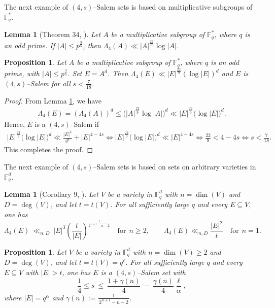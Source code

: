 \documentclass[11pt]{article}
\newtheorem{proposition}[theorem]{Proposition}
\newtheorem{lemma}[theorem]{Lemma}
\begin{document}
The next example of $(4, s)$--Salem sets is based on multiplicative subgroups of $\mathbb{F}_q^*$.
\begin{lemma}[Theorem 34, \cite{skredov}]\label{lemma:A-multiplicative}
    Let $A$ be a multiplicative subgroup of $\mathbb{F}_q^*$, where $q$ is an odd prime. If $|A|\le p^{\frac{3}{5}}$, then $\Lambda_4(A)\ll |A|^{\frac{22}{9}}\log |A|$.
\end{lemma}

\begin{proposition}\label{prop:mul}
     Let $A$ be a multiplicative subgroup of $\mathbb{F}_q^*$, where $q$ is an odd prime, with $|A|\le p^{\frac{3}{5}}$. Set $E=A^d$. Then $\Lambda_4(E)\ll |E|^{\frac{22}{9}}(\log |E|)^d$ and $E$ is $(4, s)$--Salem for all $s<\frac{7}{18}$.
\end{proposition}
\begin{proof}
    From Lemma \ref{lemma:A-multiplicative}, we have
    \begin{align*}
        \Lambda_4(E)=(\Lambda_4(A))^d \leq \bigg(|A|^{\frac{22}{9}}\log |A|  \bigg)^d \ll |E|^{\frac{22}{9}} \big(\log |E|  \big)^d. 
    \end{align*}
    Hence, $E$ is a $(4,s)$--Salem if 
    \begin{align*}
        |E|^{\frac{22}{9}} \big(\log |E|  \big)^d \ll \frac{|E|^4}{q^d}+|E|^{4-4s} \Leftrightarrow |E|^{\frac{22}{9}} \big(\log |E|  \big)^d \ll |E|^{4-4s} \Leftrightarrow \frac{22}{9}<4-4s \Leftrightarrow s<\frac{7}{18}.
    \end{align*}
This completes the proof.
\end{proof}


The next example of $(4, s)$--Salem sets is based on sets on arbitrary varieties in $\mathbb{F}_q^d$.
\begin{lemma}[Corollary 9, \cite{shkredov2}]\label{lemma-V-variety}
Let $V$ be a variety in $\mathbb{F}_q^d$ with
$n=\dim(V)$ and $D=\deg(V)$, and let $t=t(V)$.
For all sufficiently large $q$ and every $E\subseteq V,$ one has
\[
  \Lambda_4(E)\ \ll_{n,D}\ |E|^{3}\!
  \left(\frac{t}{|E|}\right)^{\!\frac{1}{2^{\,n+1}-n-2}}  \quad \mbox{for}~~n \geq 2,  \qquad \Lambda_4(E) \ll_{n,D} \frac{|E|^2}{t} \quad \mbox{for} ~~n = 1.
\]
\end{lemma}

\begin{proposition}\label{prop:mull}
    Let $V$ be a variety in $\mathbb{F}_q^d$ with
$n=\dim(V)\ge 2$ and $D=\deg(V)$, and let $t=t(V)=q^{\ell}$.
For all sufficiently large $q$ and every $E\subseteq V$ with $|E|>t$, one has $E$ is a $(4, s)$--Salem set with 
\[\frac{1}{4}\le s\ \le\ \frac{1+\gamma(n)}{4}\ -\ \frac{\gamma(n)}{4} \frac{\ell}{\alpha},\]
where $|E|=q^{\alpha}$ and $ \gamma(n):= \frac{1}{\,2^{\,n+1}-n-2\,}.$
\end{proposition}
\end{document}

